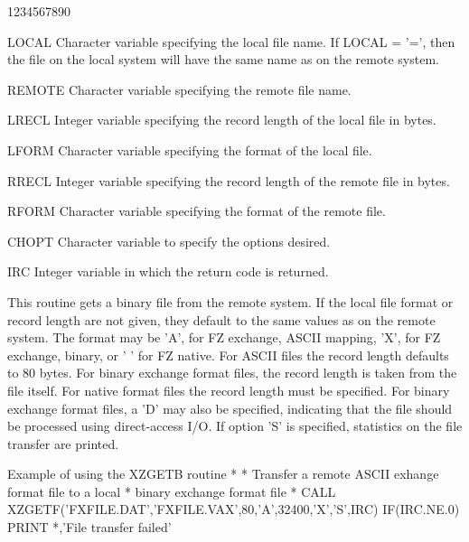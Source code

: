 \begin{DLtt}{1234567890}
\item[LOCAL]Character variable specifying the local file name.
If LOCAL = '=', then the file on the local system will
have the same name as on the remote system.
\item[REMOTE]Character variable specifying the remote file name.
\item[LRECL]Integer variable specifying the record length of the local
file in bytes.
\item[LFORM]Character variable specifying the format of the local file.
\item[RRECL]Integer variable specifying the record length of the remote
file in bytes.
\item[RFORM]Character variable specifying the format of the remote file.
\item[CHOPT]Character variable to specify the options desired.
\item[IRC]Integer variable in which the return code is returned.
\end{DLtt}
\par
This routine gets a binary file from the remote system.
If the local file format or record length are not given,
they default to the same values as on the remote system.
The format may be 'A', for FZ exchange, ASCII mapping,
'X', for FZ exchange, binary, or ' ' for FZ native.
For ASCII files the record length defaults to 80 bytes.
For binary exchange format files, the record length is taken
from the file itself. For native format files the record
length must be specified. For binary exchange format files,
a 'D' may also be specified, indicating that the file should
be processed using direct-access I/O.
If option 'S' is specified, statistics on the file transfer
are printed.
\begin{XMPt}{Example of using the XZGETB routine}
*
*     Transfer a remote ASCII exhange format file to a local
*     binary exchange format file
*
      CALL XZGETF('FXFILE.DAT','FXFILE.VAX',80,'A',32400,'X','S',IRC)
      IF(IRC.NE.0) PRINT *,'File transfer failed'
\end{XMPt}

